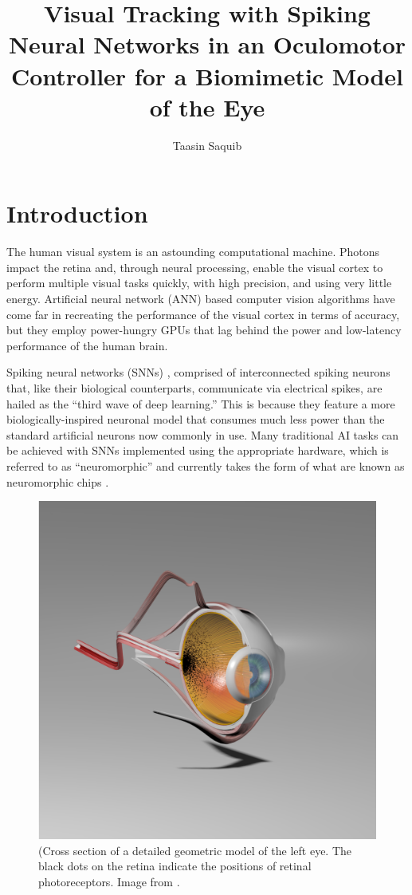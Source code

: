 \documentclass [MS] {UCLAthesis}
\title          {Visual Tracking with Spiking Neural Networks in an Oculomotor Controller for a Biomimetic Model of the Eye}
\author         {Taasin Saquib}
\begin{document}
\makeintropages


\chapter{Introduction}

The human visual system is an astounding computational machine. Photons impact the retina and, through neural processing, enable the visual cortex to perform multiple visual tasks quickly, with high precision, and using very little energy. Artificial neural network (ANN) based computer vision algorithms have come far in recreating the performance of the visual cortex in terms of accuracy, but they employ power-hungry GPUs that lag behind the power and low-latency performance of the human brain.

Spiking neural networks (SNNs) \citep{snn_survey}, comprised of interconnected spiking neurons that, like their biological counterparts, communicate via electrical spikes, are hailed as the ``third wave of deep learning.'' This is because they feature a more biologically-inspired neuronal model that consumes much less power than the standard artificial neurons now commonly in use. Many traditional AI tasks can be achieved with SNNs implemented using the appropriate hardware, which is referred to as ``neuromorphic'' and currently takes the form of what are known as neuromorphic chips \citep{snn_hw_survey}.

\begin{figure}
\centering
\includegraphics[width=0.545\linewidth,trim={0 60mm 10mm 60mm},clip]{disected_eye_final}
\caption[The biomimetic eye model]{(Cross section of a detailed geometric model of the left eye. The black dots on the retina indicate the positions of retinal photoreceptors.
Image from \citep{Arjun}.}
\label{fig:eye}
\end{figure}
\end{document}
